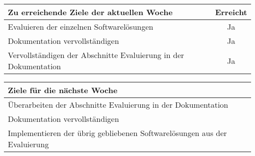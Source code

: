 \begin{tabularx}{\textwidth}{Xc}
    \arrayrulecolor{OliveGreen}
    \toprule
    {\bfseries Zu erreichende Ziele der aktuellen Woche} & {\bfseries Erreicht} \\
    \midrule[2pt]
    Evaluieren der einzelnen Softwarelösungen              &Ja               \\
    \rowcolor{OliveGreen!15}
    Dokumentation vervollständigen                         &Ja               \\
    \rowcolor{White}
    Vervollständigen der Abschnitte Evaluierung in der Dokumentation  &Ja    \\
    \bottomrule[2pt]
\end{tabularx}
%
\vspace{1cm}
%
\begin{tabularx}{\textwidth}{Xc}
    \arrayrulecolor{OliveGreen}
    \toprule
    {\bfseries Ziele für die nächste Woche}        &                         \\
    \midrule[2pt]
    Überarbeiten der Abschnitte Evaluierung in der Dokumentation  &          \\
    \rowcolor{OliveGreen!15}
    Dokumentation vervollständigen                &                          \\
    \rowcolor{White}
    Implementieren der übrig gebliebenen Softwarelösungen aus der Evaluierung & \\
\end{tabularx}
